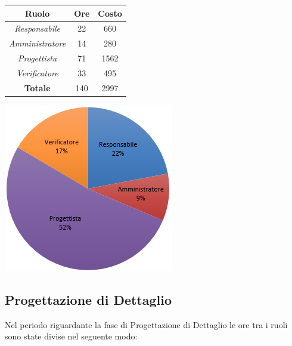 \begin{center}
  \centering
  \begin{tabular}{|c|c|c|}
    \hline
    \textbf{Ruolo} & \textbf{Ore} & \textbf{Costo} \\
    \hline
     \emph{Responsabile}  & 22 & 660 \\
    \hline  \emph{Amministratore}  & 14 & 280 \\
    \hline  \emph{Progettista}  & 71 & 1562 \\
    \hline  \emph{Verificatore}  & 33 & 495 \\
    \hline
    \textbf{Totale} & 140 & 2997 \\
    \hline
  \end{tabular}
  \includegraphics[scale=0.7]{img/3-ProgArchitetturale.png}
\end{center}

\subsection{Progettazione di Dettaglio}
Nel periodo riguardante la fase di Progettazione di Dettaglio le ore tra i ruoli sono state divise nel seguente modo: \\ \\

